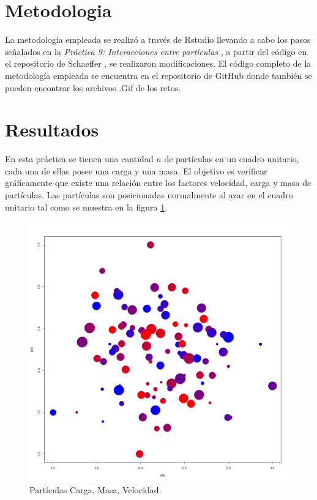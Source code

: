 \documentclass[10pt,a4paper]{article}
\begin{document}
\begin{multicols}{2}
	\section{Metodologia}	
	La metodología empleada se realizó a través de Rstudio \cite{RStudio} llevando a cabo los pasos señalados en la \textit{Práctica 9: Interacciones entre partículas} \cite{p9}, a partir del código en el repositorio de Schaeffer \cite{GITSCHAEFFER}, se realizaron modificaciones. El código completo de la metodología empleada se encuentra en el repositorio de GitHub \cite{gitadrian} donde también se pueden encontrar los archivos .Gif de los retos.
	\section{Resultados}
	En esta práctica se tienen una cantidad $n$ de partículas en un cuadro unitario, cada una de ellas posee una carga y una masa. El objetivo es verificar gráficamente que existe una relación entre los factores velocidad, carga y masa de partículas. Las partículas son posicionadas normalmente al azar en el cuadro unitario tal como se muestra en la figura \ref{fig.1}. 
				\begin{figure}[H]
				\centering
				\includegraphics[scale=0.2]{p9i.png}
				\caption{Partículas Carga, Masa, Velocidad.}
				\label{fig.1}
			\end{figure}

\end{multicols}
\end{document}
